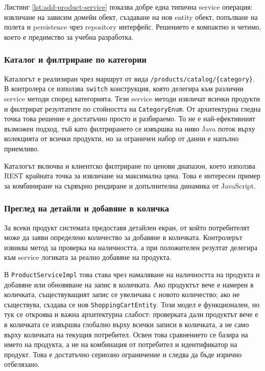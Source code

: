 Листинг \ref{lst:add-product-service} показва добре една типична service операция: извличане на зависим домейн обект, създаване на нов entity обект, попълване на полета и persistence чрез repository интерфейс. Решението е компактно и четимо, което е предимство за учебна разработка.

\subsubsection{Каталог и филтриране по категории}

Каталогът е реализиран чрез маршрут от вида \texttt{/products/catalog/\{category\}}. В контролера се използва \texttt{switch} конструкция, която делегира към различни service методи според категорията. Тези service методи извличат всички продукти и филтрират резултатите по стойността на \texttt{CategoryEnum}. От архитектурна гледна точка това решение е достатъчно просто и разбираемо. То не е най-ефективният възможен подход, тъй като филтрирането се извършва на ниво Java поток върху колекцията от всички продукти, но за ограничен набор от данни е напълно приемливо.

Каталогът включва и клиентско филтриране по ценови диапазон, което използва REST крайната точка за извличане на максимална цена. Това е интересен пример за комбиниране на сървърно рендиране и допълнителна динамика от JavaScript.

\subsubsection{Преглед на детайли и добавяне в количка}

За всеки продукт системата предоставя детайлен екран, от който потребителят може да заяви определено количество за добавяне в количката. Контролерът извиква метод за проверка на наличността, а при положителен резултат делегира към service логиката за реално добавяне на продукта.

В \texttt{ProductServiceImpl} това става чрез намаляване на наличността на продукта и добавяне или обновяване на запис в количката. Ако продуктът вече е намерен в количката, съществуващият запис се увеличава с новото количество; ако не съществува, създава се нов \texttt{ShoppingCartEntity}. Този модел е функционален, но тук се откроява и важна архитектурна слабост: проверката дали продуктът вече е в количката се извършва глобално върху всички записи в количката, а не само върху количката на текущия потребител. Освен това сравнението се базира на името на продукта, а не на комбинация от потребител и идентификатор на продукт. Това е достатъчно сериозно ограничение и следва да бъде изрично отбелязано.

